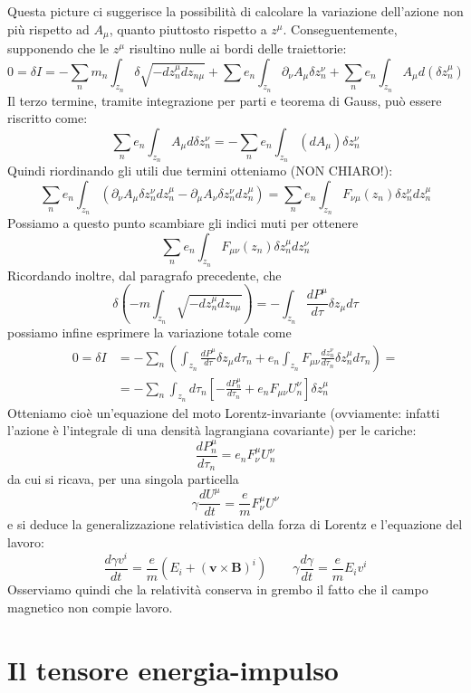 \documentclass[a4paper,11pt]{book}
\theoremstyle{plain}
\theoremstyle{definition}
\begin{document}
Questa picture ci suggerisce la possibilità di calcolare la variazione dell'azione non più rispetto ad $A_{\mu}$, quanto piuttosto rispetto a $z^{\mu}$. Conseguentemente, supponendo che le $z^{\mu}$ risultino nulle ai bordi delle traiettorie:
\[
0 = \delta I = -\sum_n m_n \int _{z_n} \delta\sqrt{-dz_n^{\mu}dz_{n\mu}} + \sum e_n \int_{z_n}\partial_{\nu}A_{\mu}\delta z_{n}^{\nu} + \sum_n e_n \int_{z_n}A_{\mu}d(\delta z_n^{\mu})
\]
Il terzo termine, tramite integrazione per parti e teorema di Gauss, può essere riscritto come:
\[
\sum_n e_n \int_{z_n}A_{\mu}d\delta z_n^{\nu} = -\sum_n e_n \int_{z_n} (dA_{\mu})\delta z_n^{\nu}
\]
Quindi riordinando gli utili due termini otteniamo (NON CHIARO!):
\[
\sum_n e_n \int_{z_n} ( \partial_{\nu}A_{\mu}\delta z_n^{\nu}dz_n^{\mu} -\partial_{\mu}A_{\nu}\delta z_n^{\nu}dz_n^{\mu} ) = \sum_n e_n \int_{z_n} F_{\nu\mu}(z_n) \delta z_n^{\nu}d z_n^{\mu}
\]
Possiamo a questo punto scambiare gli indici muti per ottenere
\[
\sum_n e_n \int_{z_n} F_{\mu\nu}(z_n) \delta z_n^{\mu}d z_n^{\nu}
\]
Ricordando inoltre, dal paragrafo precedente, che
\[
\delta\left( -m \int_{z_n} \sqrt{-dz_n^{\mu}dz_{n\mu}} \right) = -\int_{z_n}\frac{dP^{\mu}}{d\tau}\delta z_{\mu}d\tau
\]
possiamo infine esprimere la variazione totale come
\begin{align*}
0 = \delta I &= -\sum_n \left( \int_{z_n}\frac{dP^{\mu}}{d\tau}\delta z_{\mu}d\tau_n + e_n \int_{z_n}F_{\mu\nu}\frac{dz_n^{\nu}}{d\tau_n}\delta z_n^{\mu}d\tau_n  \right) = \\
&= -\sum_n \int_{z_n} d\tau_n \left[ -\frac{dP_n^{\mu}}{d\tau_n}+e_nF_{\mu\nu}U_n^{\nu} \right]\delta z_n^{\mu}
\end{align*}
Otteniamo cioè un'equazione del moto Lorentz-invariante (ovviamente: infatti l'azione è l'integrale di una densità lagrangiana covariante) per le cariche:
\[
\frac{dP_n^{\mu}}{d\tau_n}=e_nF^{\mu}_{\nu}U_n^{\nu}
\]
da cui si ricava, per una singola particella
\[
\gamma \frac{dU^{\mu}}{dt}=\frac{e}{m}F^{\mu}_{\nu}U^{\nu}
\]
e si deduce la generalizzazione relativistica della forza di Lorentz e l'equazione del lavoro:
\[
\frac{d\gamma v^i}{dt} = \frac{e}{m}(E_i+(\textbf{v}\times \textbf{B})^i) \qquad \gamma\frac{d\gamma}{dt} = \frac{e}{m}E_iv^i
\]
Osserviamo quindi che la relatività conserva in grembo il fatto che il campo magnetico non compie lavoro. 

\section{Il tensore energia-impulso}
\end{document}
